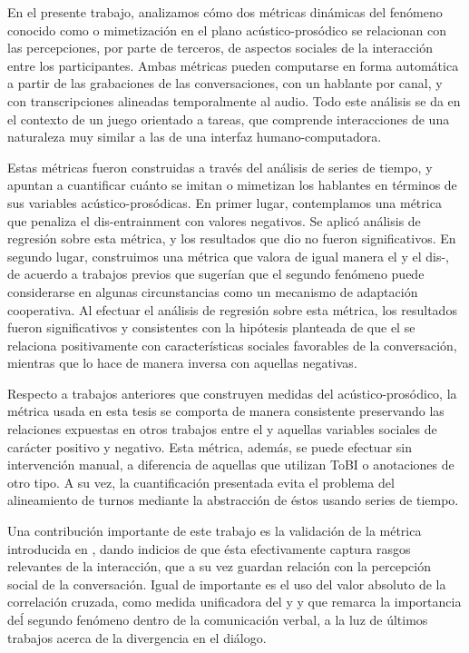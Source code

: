 En el presente trabajo, analizamos cómo dos métricas dinámicas del fenómeno conocido como \entrainment o mimetización en el plano acústico-prosódico se relacionan con las percepciones, por parte de terceros, de aspectos sociales de la interacción entre los participantes. Ambas métricas pueden computarse en forma automática a partir de las grabaciones de las conversaciones, con un hablante por canal, y con transcripciones  alineadas temporalmente al audio. Todo este análisis se da en el contexto de un juego orientado a tareas, que comprende interacciones de una naturaleza muy similar a las de una interfaz humano-computadora.

Estas métricas fueron construidas a través del análisis de series de tiempo, y apuntan a cuantificar cuánto se imitan o mimetizan los hablantes en términos de sus variables acústico-prosódicas. En primer lugar, contemplamos una métrica que penaliza el dis-entrainment con valores negativos. Se aplicó análisis de regresión sobre esta métrica, y los resultados que dio no fueron significativos. En segundo lugar, construimos una métrica que valora de igual manera el \entrainment y el dis-\entrainment, de acuerdo a trabajos previos que sugerían que el segundo fenómeno puede considerarse en algunas circunstancias como un mecanismo de adaptación cooperativa. Al efectuar el análisis de regresión sobre esta métrica, los resultados fueron significativos y consistentes con la hipótesis planteada de que el \entrainment se relaciona positivamente con características sociales favorables de la conversación, mientras que lo hace de manera inversa con aquellas negativas.

Respecto a trabajos anteriores que construyen medidas del \entrainment acústico-prosódico, la métrica usada en esta tesis se comporta de manera consistente preservando las relaciones expuestas en otros trabajos entre el \entrainment y aquellas variables sociales de carácter positivo y negativo. Esta métrica, además, se puede efectuar sin intervención manual, a diferencia de aquellas que utilizan ToBI o anotaciones de otro tipo. A su vez, la cuantificación presentada evita el problema del alineamiento de turnos mediante la abstracción de éstos usando series de tiempo.

Una contribución importante de este trabajo es la validación de la métrica introducida en \cite{KOU2008.2}, dando indicios de que ésta efectivamente captura rasgos relevantes de la interacción, que a su vez guardan relación con la percepción social de la conversación. Igual de importante es el uso del valor absoluto de la correlación cruzada, como medida unificadora del \entrainment y \disentrainment y que remarca la importancia deĺ segundo fenómeno dentro de la comunicación verbal, a la luz de últimos trabajos acerca de la divergencia en el diálogo.

